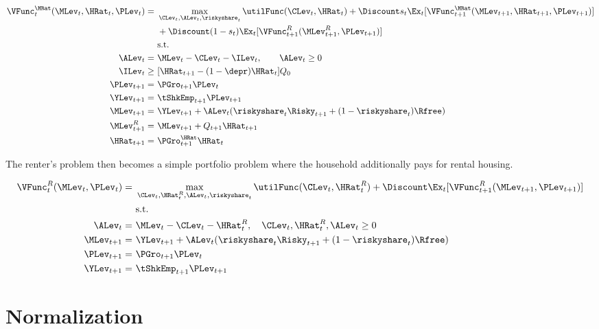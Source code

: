 \documentclass[PortfolioChoiceWithRiskyHousing]{subfiles}
\begin{document}
\begin{equation}
	\begin{split}
		\VFunc_{t}^{\HRat}(\MLev_{t}, \HRat_{t}, \PLev_{t}) = &~ \max_{\CLev_{t}, \ALev_{t}, \riskyshare_{t}} \utilFunc(\CLev_{t}, \HRat_{t})  + \Discount s_{t} \Ex_{t} [\VFunc_{t+1}^{\HRat}(\MLev_{t+1}, \HRat_{t+1}, \PLev_{t+1})] \\
		&~+ \Discount (1-s_{t}) \Ex_{t} [\VFunc_{t+1}^R(\MLev^R_{t+1}, \PLev_{t+1})] \\
		&~ \text{s.t.} \\
		\ALev_{t} = &~ \MLev_{t} - \CLev_{t} - \ILev_{t}, \qquad \ALev_{t}\ge 0 \\
		\ILev_{t} \ge &~ [\HRat_{t+1} - (1-\depr)\HRat_{t} ]Q_{0} \\
		\PLev_{t+1} = &~ \PGro_{t+1} \PLev_{t} \\
		\YLev_{t+1} = &~ \tShkEmp_{t+1}\PLev_{t+1} \\
		\MLev_{t+1} = &~ \YLev_{t+1} + \ALev_{t}(\riskyshare_{t}\Risky_{t+1} + (1-\riskyshare_{t})\Rfree)\\
		\MLev^R_{t+1} = &~ \MLev_{t+1} + Q_{t+1}\HRat_{t+1} \\
		\HRat_{t+1} = &~ \PGro^{\HRat}_{t+1} \HRat_{t}\\
	\end{split}
\end{equation}

The renter's problem then becomes a simple portfolio problem where the household additionally pays for rental housing.

\begin{equation}
	\begin{split}
		\VFunc^R_{t}(\MLev_{t}, \PLev_{t}) = &~ \max_{\CLev_{t}, \HRat^R_{t}, \ALev_{t}, \riskyshare_{t}} \utilFunc(\CLev_{t}, \HRat^R_{t}) + \Discount \Ex_{t} [\VFunc^R_{t+1}(\MLev_{t+1},\PLev_{t+1}) ]\\
		&~ \text{s.t.} \\
		\ALev_{t} = &~ \MLev_{t} - \CLev_{t} - \HRat^R_{t} , \quad \CLev_{t}, \HRat^R_{t}, \ALev_{t}\ge   0 \\
		\MLev_{t+1} = &~ \YLev_{t+1} + \ALev_{t}(\riskyshare_{t}\Risky_{t+1} + (1-\riskyshare_{t})\Rfree)\\
		\PLev_{t+1} = &~ \PGro_{t+1} \PLev_{t} \\
		\YLev_{t+1} = &~ \tShkEmp_{t+1}\PLev_{t+1}
	\end{split}
\end{equation}

\section{Normalization}
\end{document}

